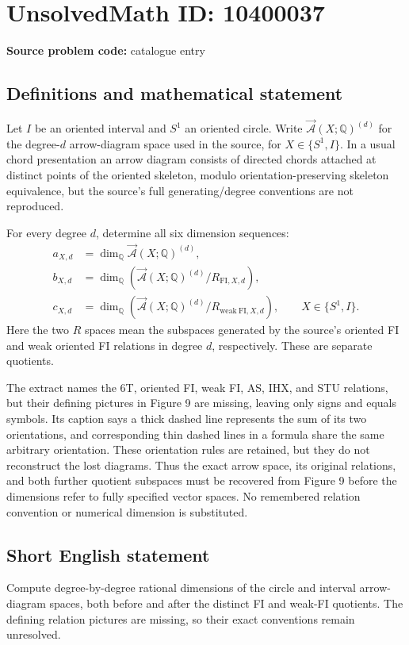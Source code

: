 \documentclass[11pt]{article}
\begin{document}
\section*{UnsolvedMath ID: 10400037}
\textbf{Source problem code:} catalogue entry
\subsection{Definitions and mathematical statement}
Let $I$ be an oriented interval and $S^1$ an oriented circle. Write $\overrightarrow{\mathcal A}(X;\mathbb Q)^{(d)}$ for the degree-$d$ arrow-diagram space used in the source, for $X\in\{S^1,I\}$. In a usual chord presentation an arrow diagram consists of directed chords attached at distinct points of the oriented skeleton, modulo orientation-preserving skeleton equivalence, but the source's full generating/degree conventions are not reproduced.

For every degree $d$, determine all six dimension sequences:
\[
\begin{aligned}
a_{X,d}&=\dim_{\mathbb Q}\overrightarrow{\mathcal A}(X;\mathbb Q)^{(d)},\\
b_{X,d}&=\dim_{\mathbb Q}\left(\overrightarrow{\mathcal A}(X;\mathbb Q)^{(d)}/R_{\mathrm{FI},X,d}\right),\\
c_{X,d}&=\dim_{\mathbb Q}\left(\overrightarrow{\mathcal A}(X;\mathbb Q)^{(d)}/R_{\mathrm{weak\ FI},X,d}\right),
\qquad X\in\{S^1,I\}.
\end{aligned}
\]
Here the two $R$ spaces mean the subspaces generated by the source's oriented FI and weak oriented FI relations in degree $d$, respectively. These are separate quotients.

The extract names the 6T, oriented FI, weak FI, AS, IHX, and STU relations, but their defining pictures in Figure 9 are missing, leaving only signs and equals symbols. Its caption says a thick dashed line represents the sum of its two orientations, and corresponding thin dashed lines in a formula share the same arbitrary orientation. These orientation rules are retained, but they do not reconstruct the lost diagrams. Thus the exact arrow space, its original relations, and both further quotient subspaces must be recovered from Figure 9 before the dimensions refer to fully specified vector spaces. No remembered relation convention or numerical dimension is substituted.
\subsection{Short English statement}
Compute degree-by-degree rational dimensions of the circle and interval arrow-diagram spaces, both before and after the distinct FI and weak-FI quotients. The defining relation pictures are missing, so their exact conventions remain unresolved.
\end{document}
